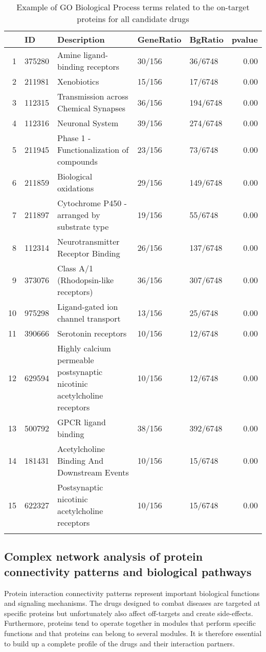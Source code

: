 \documentclass[preprint,11pt]{elsarticle}
\begin{document}
\begin{table}[h]
\centering \scriptsize \caption{Example of GO Biological Process terms related to the on-target proteins for all candidate drugs}\label{goterms}
\begin{tabular}{rllllr}
  \hline 
 & ID & Description & GeneRatio & BgRatio & pvalue  \\ 
  \hline
1 & 375280 & Amine ligand-binding receptors & 30/156 & 36/6748 & 0.00 \\ 
  2 & 211981 & Xenobiotics & 15/156 & 17/6748 & 0.00 \\ 
  3 & 112315 & Transmission across Chemical Synapses & 36/156 & 194/6748 & 0.00  \\ 
  4 & 112316 & Neuronal System & 39/156 & 274/6748 & 0.00 \\ 
  5 & 211945 & Phase 1 - Functionalization of compounds & 23/156 & 73/6748 & 0.00 \\ 
  6 & 211859 & Biological oxidations & 29/156 & 149/6748 & 0.00 \\ 
  7 & 211897 & Cytochrome P450 - arranged by substrate type & 19/156 & 55/6748 & 0.00  \\ 
  8 & 112314 & Neurotransmitter Receptor Binding  & 26/156 & 137/6748 & 0.00 \\ 
  9 & 373076 & Class A/1 (Rhodopsin-like receptors) & 36/156 & 307/6748 & 0.00 \\ 
  10 & 975298 & Ligand-gated ion channel transport & 13/156 & 25/6748 & 0.00 \\ 
  11 & 390666 & Serotonin receptors & 10/156 & 12/6748 & 0.00 \\ 
  12 & 629594 & Highly calcium permeable postsynaptic nicotinic acetylcholine receptors & 10/156 & 12/6748 & 0.00 \\ 
  13 & 500792 & GPCR ligand binding & 38/156 & 392/6748 & 0.00 \\ 
  14 & 181431 & Acetylcholine Binding And Downstream Events & 10/156 & 15/6748 & 0.00 \\ 
  15 & 622327 & Postsynaptic nicotinic acetylcholine receptors & 10/156 & 15/6748 & 0.00 \\ 
   \hline \normalsize
\end{tabular}
\end{table}

\subsection{Complex network analysis of protein connectivity patterns and biological pathways}
Protein interaction connectivity patterns represent important biological functions and signaling mechanisms.  The drugs designed to combat diseases are targeted at specific proteins but unfortunately also affect off-targets and create side-effects. Furthermore, proteins tend to operate together in modules that perform specific functions and that proteins can belong to several modules. It is therefore essential to build up a complete profile of the drugs and their interaction partners. 
\end{document}
